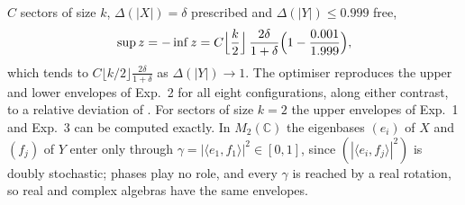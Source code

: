 \documentclass[11pt]{article}
\newcommand{\C}{\mathbb{C}}
\begin{document}
$C$ sectors of size $k$, $\Delta(|X|)=\delta$ prescribed and $\Delta(|Y|)\le0.999$
free,
\[
  \sup z=-\inf z=C\Bigl\lfloor\frac k2\Bigr\rfloor\,\frac{2\delta}{1+\delta}\Bigl(1-\frac{0.001}{1.999}\Bigr),
\]
which tends to $C\lfloor k/2\rfloor\frac{2\delta}{1+\delta}$ as $\Delta(|Y|)\to1$. The optimiser reproduces the upper and
lower envelopes of Exp.~2 for all eight configurations, along either contrast, to a relative deviation of
.
For sectors of size $k=2$ the upper envelopes of Exp.~1 and Exp.~3 can be computed exactly. In $M_2(\C)$ the
eigenbases $(e_i)$ of $X$ and $(f_j)$ of $Y$ enter only through $\gamma=|\langle e_1,f_1\rangle|^2\in[0,1]$, since
$(|\langle e_i,f_j\rangle|^2)$ is doubly stochastic; phases play no role, and every $\gamma$ is reached by a real rotation, so
real and complex algebras have the same envelopes.
\end{document}
